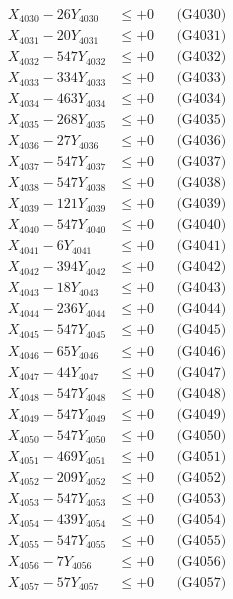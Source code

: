 \documentclass[a4paper,10pt]{article}
\begin{document}
{\begin{align}
X_{4030} - 26Y_{4030} &\leq +0 && \text{(G4030)} \\
\allowbreak
X_{4031} - 20Y_{4031} &\leq +0 && \text{(G4031)} \\
X_{4032} - 547Y_{4032} &\leq +0 && \text{(G4032)} \\
X_{4033} - 334Y_{4033} &\leq +0 && \text{(G4033)} \\
X_{4034} - 463Y_{4034} &\leq +0 && \text{(G4034)} \\
X_{4035} - 268Y_{4035} &\leq +0 && \text{(G4035)} \\
X_{4036} - 27Y_{4036} &\leq +0 && \text{(G4036)} \\
X_{4037} - 547Y_{4037} &\leq +0 && \text{(G4037)} \\
X_{4038} - 547Y_{4038} &\leq +0 && \text{(G4038)} \\
X_{4039} - 121Y_{4039} &\leq +0 && \text{(G4039)} \\
X_{4040} - 547Y_{4040} &\leq +0 && \text{(G4040)} \\
\allowbreak
X_{4041} - 6Y_{4041} &\leq +0 && \text{(G4041)} \\
X_{4042} - 394Y_{4042} &\leq +0 && \text{(G4042)} \\
X_{4043} - 18Y_{4043} &\leq +0 && \text{(G4043)} \\
X_{4044} - 236Y_{4044} &\leq +0 && \text{(G4044)} \\
X_{4045} - 547Y_{4045} &\leq +0 && \text{(G4045)} \\
X_{4046} - 65Y_{4046} &\leq +0 && \text{(G4046)} \\
X_{4047} - 44Y_{4047} &\leq +0 && \text{(G4047)} \\
X_{4048} - 547Y_{4048} &\leq +0 && \text{(G4048)} \\
X_{4049} - 547Y_{4049} &\leq +0 && \text{(G4049)} \\
X_{4050} - 547Y_{4050} &\leq +0 && \text{(G4050)} \\
\allowbreak
X_{4051} - 469Y_{4051} &\leq +0 && \text{(G4051)} \\
X_{4052} - 209Y_{4052} &\leq +0 && \text{(G4052)} \\
X_{4053} - 547Y_{4053} &\leq +0 && \text{(G4053)} \\
X_{4054} - 439Y_{4054} &\leq +0 && \text{(G4054)} \\
X_{4055} - 547Y_{4055} &\leq +0 && \text{(G4055)} \\
X_{4056} - 7Y_{4056} &\leq +0 && \text{(G4056)} \\
X_{4057} - 57Y_{4057} &\leq +0 && \text{(G4057)} \\

\end{align}}
\end{document}
